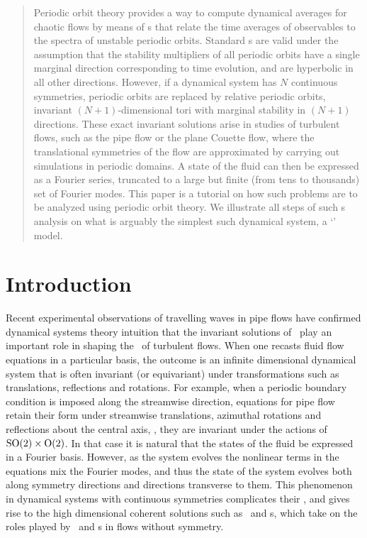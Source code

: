 \documentclass[aip,cha,
reprint,
secnumarabic,
nofootinbib, tightenlines,
nobibnotes, showkeys, showpacs,
superscriptaddress,
]{revtex4-1}
\begin{document}
\begin{quotation}
Periodic orbit theory provides a way to compute dynamical averages for
chaotic flows by means of {\cycForm s} that relate the time averages of
observables to the spectra of unstable periodic orbits. Standard
{\cycForm s} are valid under the assumption that the stability
multipliers of all periodic orbits have a single marginal direction
corresponding to time evolution, and are hyperbolic in all other
directions. However, if a dynamical system has $N$ continuous symmetries,
periodic orbits are replaced by relative periodic orbits, invariant
$(N+1)$-dimensional tori with marginal stability in $(N+1)$ directions.
These exact invariant solutions arise in studies of turbulent flows, such
as the pipe flow or the plane Couette flow, where the translational
symmetries of the flow are approximated by carrying out simulations in
periodic domains. A state of the fluid can then be expressed as a Fourier
series, truncated to a large but finite (from tens to thousands) set of
Fourier modes. This paper is a tutorial on how such problems are to be
analyzed using periodic orbit theory. We illustrate all steps of such
\rpo s analysis on what is arguably the simplest such dynamical system, a
`\twomode' model.
\end{quotation}

\section{Introduction}
\label{s:intro}

Recent experimental observations of travelling waves in pipe flows have
confirmed dynamical systems theory intuition that the invariant solutions
of \NSe\ play an important role in shaping the \statesp\ of turbulent
flows. When one recasts fluid flow equations in a
particular basis, the outcome is an infinite dimensional dynamical system
that is often invariant (or equivariant) under transformations such as
translations, reflections and rotations. For example, when a periodic
boundary condition is imposed along the streamwise direction, equations
for pipe flow retain their form under streamwise translations, azimuthal
rotations and reflections about the central axis, \ie, they are invariant
under the actions of $\textrm{SO}(2) \times \textrm{O}(2)$. In that case it is natural
that the states of the fluid be expressed in a Fourier basis. However,
as the system evolves the nonlinear terms in the equations mix the
Fourier modes, and thus the state of the system evolves both along
symmetry directions and directions transverse to them.
This phenomenon in dynamical systems with continuous symmetries
complicates their \statesp, and gives rise to the high dimensional coherent
solutions such as \reqva\ and \rpo s, which take on the roles played by
\eqva\ and \po s in flows without symmetry.
\end{document}
